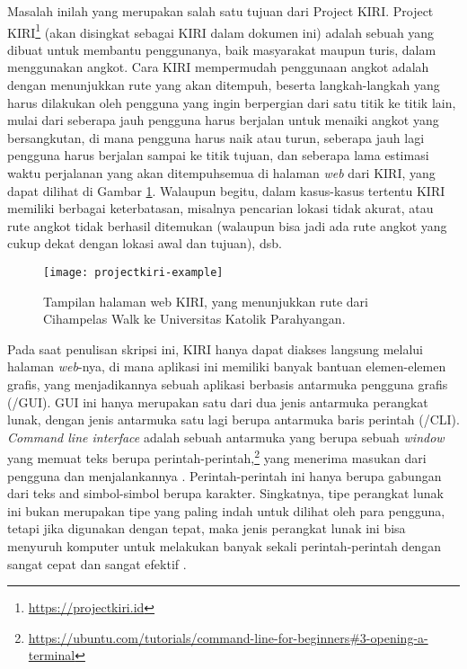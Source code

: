 Masalah inilah yang merupakan salah satu tujuan dari Project KIRI. Project KIRI\footnote{\href{https://projectkiri.id}{https://projectkiri.id}} (akan disingkat sebagai KIRI dalam dokumen ini) adalah sebuah \websoftware\xspace yang dibuat untuk membantu penggunanya, baik masyarakat maupun turis, dalam menggunakan angkot. Cara KIRI mempermudah penggunaan angkot adalah dengan menunjukkan rute yang akan ditempuh, beserta langkah-langkah yang harus dilakukan oleh pengguna yang ingin berpergian dari satu titik ke titik lain, mulai dari seberapa jauh pengguna harus berjalan untuk menaiki angkot yang bersangkutan, di mana pengguna harus naik atau turun, seberapa jauh lagi pengguna harus berjalan sampai ke titik tujuan, dan seberapa lama estimasi waktu perjalanan yang akan ditempuh\textemdash semua di halaman \textit{web} dari KIRI, yang dapat dilihat di Gambar \ref{fig:kiri-page}. Walaupun begitu, dalam kasus-kasus tertentu KIRI memiliki berbagai keterbatasan, misalnya pencarian lokasi tidak akurat, atau rute angkot tidak berhasil ditemukan (walaupun bisa jadi ada rute angkot yang cukup dekat dengan lokasi awal dan tujuan), dsb.

\begin{figure}[ht]
    \centering
    \texttt{[image: projectkiri-example]}
    \caption[Tampilan halaman web KIRI]{Tampilan halaman web KIRI, yang menunjukkan rute dari Cihampelas Walk ke Universitas Katolik Parahyangan.}
    \label{fig:kiri-page}
\end{figure}

Pada saat penulisan skripsi ini, KIRI hanya dapat diakses langsung melalui halaman \textit{web}-nya, di mana aplikasi ini memiliki banyak bantuan elemen-elemen grafis, yang menjadikannya sebuah aplikasi berbasis antarmuka pengguna grafis (\gui /GUI). GUI ini hanya merupakan satu dari dua jenis antarmuka perangkat lunak, dengan jenis antarmuka satu lagi berupa antarmuka baris perintah (\cli /CLI). \textit{Command line interface} adalah sebuah antarmuka yang berupa sebuah \textit{window} yang memuat teks berupa perintah-perintah,\footnote{\href{https://ubuntu.com/tutorials/command-line-for-beginners\#3-opening-a-terminal}{https://ubuntu.com/tutorials/command-line-for-beginners\#3-opening-a-terminal}} yang menerima masukan dari pengguna dan  menjalankannya \cite{marsh:2010:fatfreeintrotocommandline}. Perintah-perintah ini hanya berupa gabungan dari teks and simbol-simbol berupa karakter. Singkatnya, tipe perangkat lunak ini bukan merupakan tipe yang paling indah untuk dilihat oleh para pengguna, tetapi jika digunakan dengan tepat, maka \mbox{jenis} \mbox{perangkat} lunak ini bisa menyuruh komputer untuk melakukan banyak sekali perintah-perintah dengan sangat cepat dan sangat efektif \cite{shottsjr:2019:linuxcommandline}.

